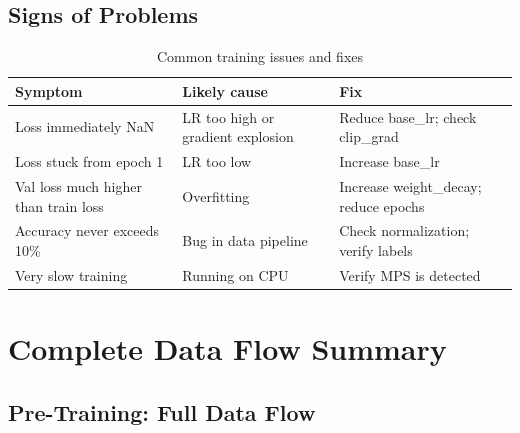 \documentclass[12pt, a4paper]{report}
\begin{document}
\section{Signs of Problems}

\begin{table}[H]
\centering
\begin{tabular}{p{4cm}p{4cm}p{5cm}}
\toprule
\textbf{Symptom} & \textbf{Likely cause} & \textbf{Fix} \\
\midrule
Loss immediately NaN & LR too high or gradient explosion & Reduce base\_lr; check clip\_grad \\
Loss stuck from epoch 1 & LR too low & Increase base\_lr \\
Val loss much higher than train loss & Overfitting & Increase weight\_decay; reduce epochs \\
Accuracy never exceeds 10\% & Bug in data pipeline & Check normalization; verify labels \\
Very slow training & Running on CPU & Verify MPS is detected \\
\bottomrule
\end{tabular}
\caption{Common training issues and fixes}
\end{table}

\chapter{Complete Data Flow Summary}

\section{Pre-Training: Full Data Flow}
\end{document}
